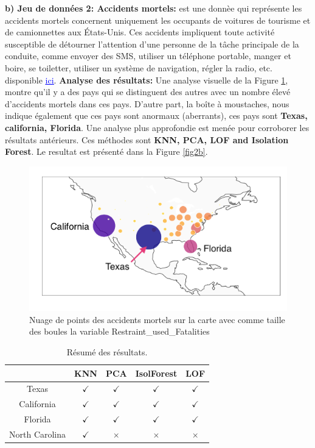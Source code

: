 \noindent\textbf{b) Jeu de données 2: Accidents mortels:}
 est une donnèe qui représente les accidents mortels concernent uniquement les occupants de voitures de tourisme et de camionnettes aux États-Unis. Ces accidents impliquent toute activité susceptible de détourner l'attention d'une personne de la tâche principale de la conduite, comme envoyer des SMS, utiliser un téléphone portable, manger et boire, se toiletter, utiliser un système de navigation, régler la radio, etc. disponible  \href{https://www.bts.dot.gov/content/passenger-car-and-light-truck-occupants-killed-and-restraint-use}{\textcolor{blue}{\underline{ici}}}. \newl
\noindent\textbf{Analyse des résultats:}
Une analyse visuelle de la Figure \ref{fig2}, montre qu'il y a des pays qui se distinguent des autres avec un nombre élevé d'accidents mortels dans ces pays. D'autre part, la boîte à moustaches, nous indique également que ces pays sont anormaux (aberrants), ces pays sont \textbf{Texas, california, Florida}. Une analyse plus approfondie est menée pour corroborer les résultats antérieurs. Ces méthodes sont \textbf{ KNN, PCA, LOF and Isolation Forest}. Le resultat est présenté dans la Figure  \ref{fig2b}. 
\begin{figure}[H]
    \centering
    \includegraphics[width=.5\textwidth]{ADOA/Images/fat1png.png}
    \caption{Nuage de points des accidents mortels sur la carte avec comme taille des boules la variable Restraint\_used\_Fatalities}%
    \label{fig2}
\end{figure}
%
%
\begin{table}[ht!]
\centering
 \begin{tabular}{||c c c c c||} 
 \hline
 &  KNN & PCA & IsolForest & LOF\\ [0.5ex] 
 \hline\hline
Texas & $\checkmark$ & $\checkmark$  & $\checkmark$ & $\checkmark$ \\ 
 California & $\checkmark$ & $\checkmark$  & $\checkmark$ & $\checkmark$ \\
Florida & $\checkmark$ & $\checkmark$  & $\checkmark$ & $\checkmark$ \\
 North Carolina & $\checkmark$ & $\times$  & $\times$ & $\times$ \\ [1ex] 
 \hline
 \end{tabular}
 \caption{Résumé des résultats.}
\end{table}
